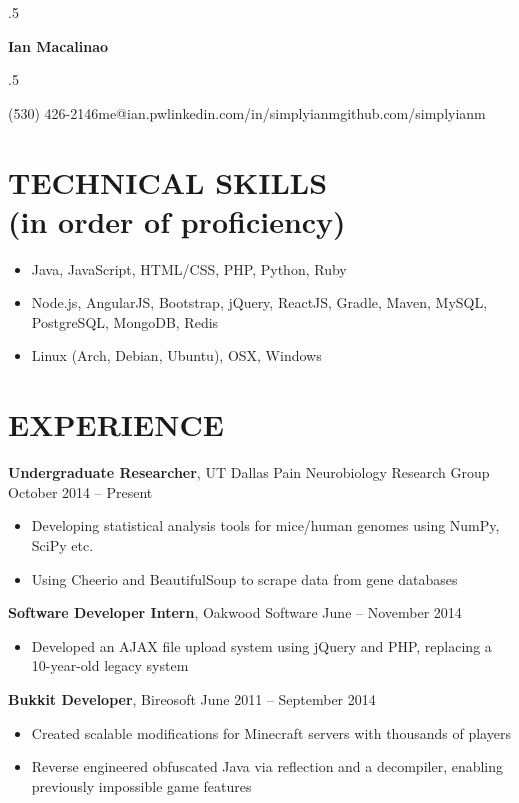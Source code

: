 \documentclass{res} %
\makeatletter
\def\ULurl@#1{\hyper@linkurl{\ULurl@@{#1}}{#1}}
\DeclareRobustCommand*\ULurl{\hyper@normalise\ULurl@}
\newcommand*{\its}{\hspace{0.8cm}}
\makeatother
\begin{document}
\moveleft.5\hoffset\centerline{\Huge\bf Ian Macalinao}
\bigskip
\moveleft.5\hoffset\centerline{(530) 426-2146\its{}me@ian.pw\its{}\ULurl{http://ian.pw}\its{}linkedin.com/in/simplyianm\its{}github.com/simplyianm}

\section{TECHNICAL SKILLS \\ \textnormal{(in order of proficiency)}}

\begin{itemize} \itemsep -2pt
  \item Java, JavaScript, HTML/CSS, PHP, Python, Ruby
  \item Node.js, AngularJS, Bootstrap, jQuery, ReactJS, Gradle, Maven, MySQL, PostgreSQL, MongoDB, Redis
  \item Linux (Arch, Debian, Ubuntu), OSX, Windows
\end{itemize}

\section{EXPERIENCE}

{\bf Undergraduate Researcher}, UT Dallas Pain Neurobiology Research Group \hfill October 2014 -- Present
\begin{itemize} \itemsep -2pt
  \item Developing statistical analysis tools for mice/human genomes using NumPy, SciPy etc.
  \item Using Cheerio and BeautifulSoup to scrape data from gene databases
\end{itemize}

{\bf Software Developer Intern}, Oakwood Software \hfill June -- November 2014
\begin{itemize} \itemsep -2pt
  \item Developed an AJAX file upload system using jQuery and PHP, replacing a 10-year-old legacy system
\end{itemize}

{\bf Bukkit Developer}, Bireosoft \hfill June 2011 -- September 2014
\begin{itemize} \itemsep -2pt
  \item Created scalable modifications for Minecraft servers with thousands of players
  \item Reverse engineered obfuscated Java via reflection and a decompiler, enabling previously impossible game features
\end{itemize}
\end{document}
